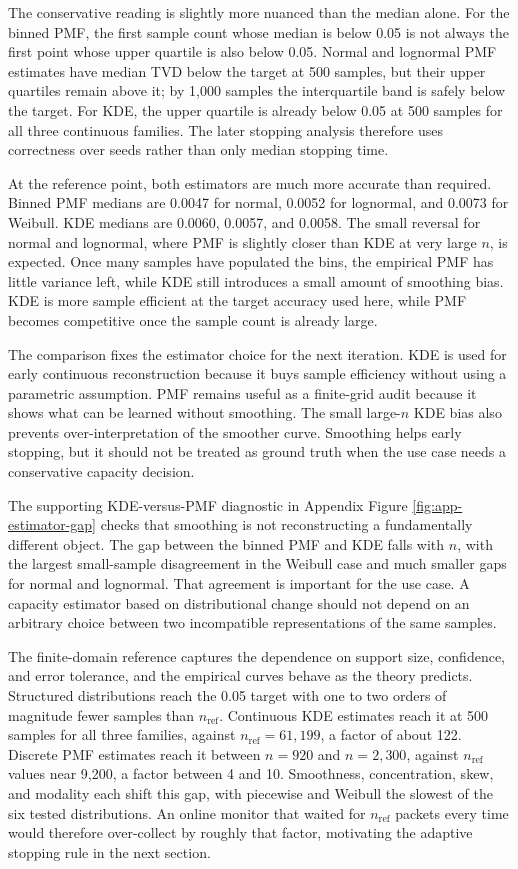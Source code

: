 \documentclass[a4paper,11pt]{report}
\begin{document}
The conservative reading is slightly more nuanced than the median alone. For the binned PMF, the first sample count whose median is below 0.05 is not always the first point whose upper quartile is also below 0.05. Normal and lognormal PMF estimates have median TVD below the target at 500 samples, but their upper quartiles remain above it; by 1,000 samples the interquartile band is safely below the target. For KDE, the upper quartile is already below 0.05 at 500 samples for all three continuous families. The later stopping analysis therefore uses correctness over seeds rather than only median stopping time.

At the reference point, both estimators are much more accurate than required. Binned PMF medians are 0.0047 for normal, 0.0052 for lognormal, and 0.0073 for Weibull. KDE medians are 0.0060, 0.0057, and 0.0058. The small reversal for normal and lognormal, where PMF is slightly closer than KDE at very large \(n\), is expected. Once many samples have populated the bins, the empirical PMF has little variance left, while KDE still introduces a small amount of smoothing bias. KDE is more sample efficient at the target accuracy used here, while PMF becomes competitive once the sample count is already large.

The comparison fixes the estimator choice for the next iteration. KDE is used for early continuous reconstruction because it buys sample efficiency without using a parametric assumption. PMF remains useful as a finite-grid audit because it shows what can be learned without smoothing. The small large-\(n\) KDE bias also prevents over-interpretation of the smoother curve. Smoothing helps early stopping, but it should not be treated as ground truth when the use case needs a conservative capacity decision.

The supporting KDE-versus-PMF diagnostic in Appendix Figure \ref{fig:app-estimator-gap} checks that smoothing is not reconstructing a fundamentally different object. The gap between the binned PMF and KDE falls with \(n\), with the largest small-sample disagreement in the Weibull case and much smaller gaps for normal and lognormal. That agreement is important for the use case. A capacity estimator based on distributional change should not depend on an arbitrary choice between two incompatible representations of the same samples.

The finite-domain reference captures the dependence on support size, confidence, and error tolerance, and the empirical curves behave as the theory predicts. Structured distributions reach the 0.05 target with one to two orders of magnitude fewer samples than \(n_{\mathrm{ref}}\). Continuous KDE estimates reach it at 500 samples for all three families, against \(n_{\mathrm{ref}}=61{,}199\), a factor of about 122. Discrete PMF estimates reach it between \(n=920\) and \(n=2{,}300\), against \(n_{\mathrm{ref}}\) values near 9{,}200, a factor between 4 and 10. Smoothness, concentration, skew, and modality each shift this gap, with piecewise and Weibull the slowest of the six tested distributions. An online monitor that waited for \(n_{\mathrm{ref}}\) packets every time would therefore over-collect by roughly that factor, motivating the adaptive stopping rule in the next section.
\end{document}
